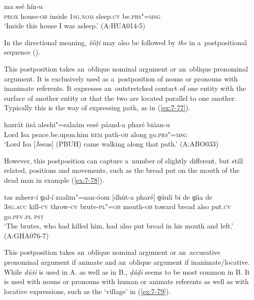 \begin{exe}
\ex
\label{ex:7-76}
 ma seé hín-u  \\
\textsc{prox} house-\textsc{ob}  inside \textsc{1sg.nom} sleep.\textsc{cv} be.\textsc{prs"=msg}  \\
\glt `Inside this house I was asleep.' (A:HUA014-5)
\end{exe}

In the directional meaning, \textit{šíiṭi} may also be followed by \textit{the} in a~postpositional sequence ().


 This postposition takes an~oblique nominal argument or an~oblique pronominal argument. It is exclusively used as a~postposition of nouns or pronouns with inanimate referents. It expresses an~outstretched contact of one entity with the surface of another entity or that the two are located parallel to one another. Typically this is the way of expressing path, as in (\ref{ex:7-77}).

\begin{exe}
\ex
\label{ex:7-77}
\gll hazrát iisá aleehi"=salaám eesé páand-a pharé biáan-u \\
Lord Isa peace.be.upon.him \textsc{rem} path-\textsc{ob} along go.\textsc{prs"=msg} \\
\glt `Lord Isa [Jesus] (PBUH) came walking along that path.' (A:ABO033)
\end{exe}

However, this postposition can capture a~number of slightly different, but still related, positions and movements, such as the bread put on the mouth of the dead man in example (\ref{ex:7-78}). 

\begin{exe}
\ex
\label{ex:7-78}
\gll tas mheer-í ɡal-í zaalim"=aan-óom [dhút-a pharé] ɡúuli bi de ɡíia de \\
\textsc{3sg.acc} kill-\textsc{cv} throw-\textsc{cv} brute-\textsc{pl"=ob} mouth-\textsc{ob} toward bread also put.\textsc{cv} go.\textsc{pfv.pl} \textsc{pst} \\
\glt `The brutes, who had killed him, had also put bread in his mouth and left.' (A:GHA076-7)
\end{exe}

 This postposition takes an~oblique nominal argument or an~accusative pronominal argument if animate and an~oblique argument if inanimate/locative. While \textit{dúši} is used in A. as well as in B., \textit{ḍáḍi} seems to be most common in B. It is used with nouns or pronouns with human or animate referents as well as with locative expressions, such as the `village' in (\ref{ex:7-79}). 


